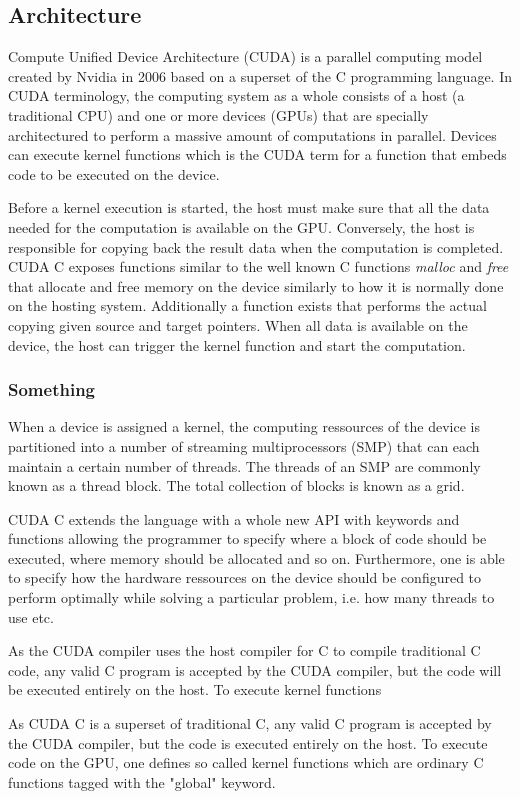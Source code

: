 
\subsection{Architecture}
Compute Unified Device Architecture (CUDA) is a parallel computing model created by Nvidia in 2006 based on a superset of the C programming language. In CUDA terminology, the computing system as a whole consists of a host (a traditional CPU) and one or more devices (GPUs) that are specially architectured to perform a massive amount of computations in parallel. Devices can execute kernel functions which is the CUDA term for a function that embeds code to be executed on the device.

Before a kernel execution is started, the host must make sure that all the data needed for the computation is available on the GPU. Conversely, the host is responsible for copying back the result data when the computation is completed. CUDA C exposes functions similar to the well known C functions \emph{malloc} and \emph{free} that allocate and free memory on the device similarly to how it is normally done on the hosting system. Additionally a function exists that performs the actual copying given source and target pointers. When all data is available on the device, the host can trigger the kernel function and start the computation.

\subsubsection{Something}

When a device is assigned a kernel, the computing ressources of the device is partitioned into a number of streaming multiprocessors (SMP) that can each maintain a certain number of threads. The threads of an SMP are  commonly known as a thread block. The total collection of blocks is known as a grid. 

CUDA C extends the language with a whole new API with keywords and functions allowing the programmer to specify where a block of code should be executed, where memory should be allocated and so on. Furthermore, one is able to specify how the hardware ressources on the device should be configured to perform optimally while solving a particular problem, i.e. how many threads to use etc.



As the CUDA compiler uses the host compiler for C to compile traditional C code, any valid C program is accepted by the CUDA compiler, but the code will be executed entirely on the host. To execute kernel functions 


As CUDA C is a superset of traditional C, any valid C program is accepted by the CUDA compiler, but the code is executed entirely on the host. To execute code on the GPU, one defines so called kernel functions which are ordinary C functions tagged with the "global" keyword.